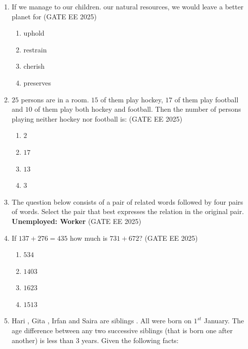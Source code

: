 \documentclass[journal]{IEEEtran}
\begin{document}
\begin{enumerate}[start=26]
\item  If we manage to our children. our natural resources, we would leave a better planet for
\hfill{(GATE EE 2025)}
\begin{enumerate}
    \item  uphold
\item  restrain
\item  cherish
\item  preserves
\end{enumerate}

\item $25$ persons are in a room. $15$ of them play hockey, $17$ of them play football and $10$ of them play both hockey and football. Then the number of persons playing neither hockey nor football is:
\hfill{(GATE EE 2025)}
\begin{enumerate}
    \item  $2$
\item  $17$
\item  $13$
\item  $3$
\end{enumerate}
\item The question below consists of a pair of related words followed by four pairs of words. Select the pair that best expresses the relation in the original pair.
\textbf{Unemployed: Worker}
\hfill{(GATE EE 2025)}
\begin{enumerate}
\end{enumerate}

\item If $137 +276 = 435$ how much is $731 + 672$?
\hfill{(GATE EE 2025)}
\begin{enumerate}
    \item  $534$
\item  $1403$
\item  $1623$
\item  $1513$
\end{enumerate}

\item  Hari , Gita , Irfan  and Saira  are siblings . All were born on $1^{st}$ January. The age difference between any two successive siblings (that is born one after another) is less than $3$ years. Given the following facts:


\end{enumerate}
\end{document}
